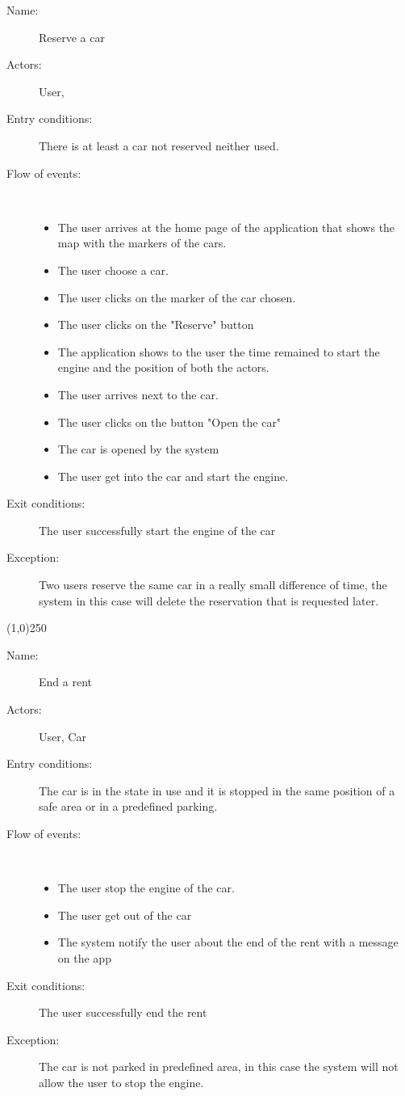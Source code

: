 \begin{description}
	\item[Name:] Reserve a car
	\item[Actors:] User, 
	\item[Entry conditions:] There is at least a car not reserved neither used.
	\item[Flow of events:]  \ \\
		\begin{itemize}
			\item The user arrives at the home page of the application that shows the map with the markers of the cars.
			\item The user choose a car.
			\item The user clicks on the marker of the car chosen.
			\item The user clicks on the "Reserve" button
			\item The application shows to the user the time remained to start the engine and the position of both the actors.
			\item The user arrives next to the car.
			\item The user clicks on the button "Open the car"
			\item The car is opened by the system
			\item The user get into the car and start the engine.
		\end{itemize}
	\item[Exit conditions:] The user successfully start the engine of the car
	\item [Exception:] Two users reserve the same car in a really small difference of time, the system in this case will delete the reservation that is requested later.
\end{description}

\begin{center}
\line(1,0){250}
\end{center}

\begin{description}
	\item[Name:] End a rent
	\item[Actors:] User, Car 
	\item[Entry conditions:] The car is in the state in use and it is stopped in the same position of a safe area or in a predefined parking.
	\item[Flow of events:]  \ \\
		\begin{itemize}
			\item The user stop the engine of the car.
			\item The user get out of the car 
			\item The system notify the user about the end of the rent with a message on the app
		\end{itemize}
	\item[Exit conditions:] The user successfully end the rent
	\item [Exception:] The car is not parked in predefined area, in this case the system will not allow the user to stop the engine.
\end{description}

